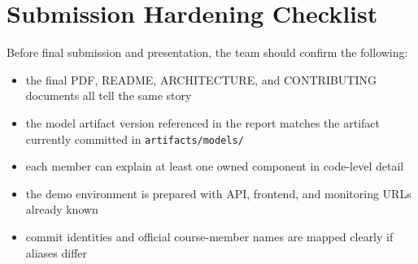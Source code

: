 \documentclass[11pt]{article}
\newcommand{\code}[1]{\texttt{#1}}
\begin{document}
\section{Submission Hardening Checklist}
Before final submission and presentation, the team should confirm the following:
\begin{itemize}
  \item the final PDF, README, ARCHITECTURE, and CONTRIBUTING documents all tell the same story
  \item the model artifact version referenced in the report matches the artifact currently committed in \code{artifacts/models/}
  \item each member can explain at least one owned component in code-level detail
  \item the demo environment is prepared with API, frontend, and monitoring URLs already known
  \item commit identities and official course-member names are mapped clearly if aliases differ
\end{itemize}
\end{document}
